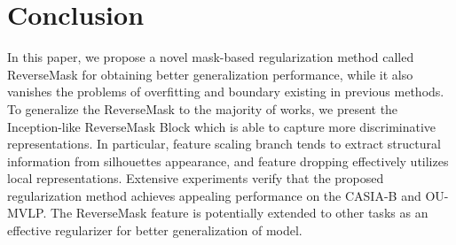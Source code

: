 \documentclass[runningheads]{llncs}
\begin{document}
\begin{table}[htbp]
\vspace*{-1.5em}
\caption{Performance of different regularization techniques. \textbf{RMB} donates ReverseMask Block for short. While Scaling DropBlock is a DropBlock-like regularization, Scaling DropBlock scales feature map rather than dropping. }
\vspace*{-1em}
\centering
\footnotesize
{}
\label{tab:augmentation}
\vspace*{-3em}
\end{table}









\section{Conclusion}
    In this paper, we propose a novel mask-based regularization method called ReverseMask for obtaining better generalization performance, while it also vanishes the problems of overfitting and boundary existing in previous methods. To generalize the ReverseMask to the majority of works, we present the Inception-like ReverseMask Block which is able to capture more discriminative representations. In particular, feature scaling branch tends to extract structural information from silhouettes appearance, and feature dropping effectively utilizes local representations. Extensive experiments verify that the proposed regularization method achieves appealing performance on the CASIA-B and OU-MVLP. The ReverseMask feature is potentially extended to other tasks as an effective regularizer for better generalization of model.
    




\clearpage


\end{document}
